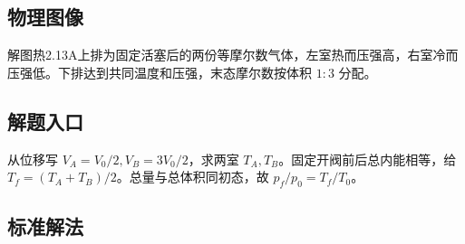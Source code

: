 \documentclass[UTF8,fontset=fandol,a4paper,11pt]{ctexart}
\begin{document}


\subsection*{物理图像}

解图热2.13A上排为固定活塞后的两份等摩尔数气体，左室热而压强高，右室冷而压强低。下排达到共同温度和压强，末态摩尔数按体积 $1:3$ 分配。



\subsection*{解题入口}

从位移写 $V_A=V_0/2,V_B=3V_0/2$，求两室 $T_A,T_B$。固定开阀前后总内能相等，给 $T_f=(T_A+T_B)/2$。总量与总体积同初态，故 $p_f/p_0=T_f/T_0$。




\subsection*{标准解法}
\end{document}

